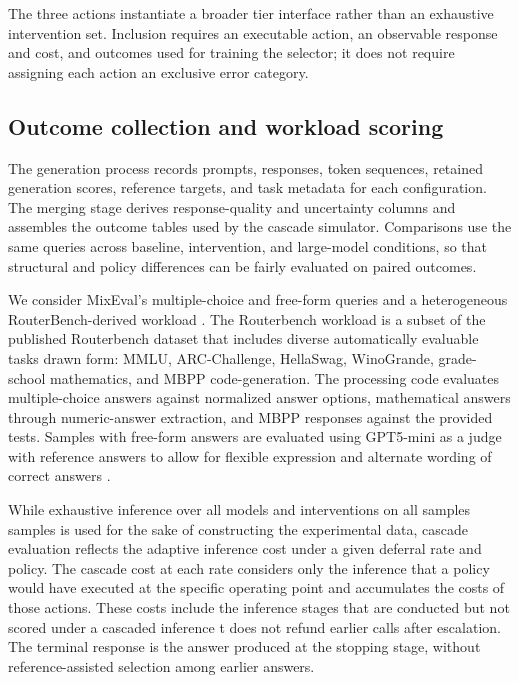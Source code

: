 \documentclass[sigconf]{acmart}
\begin{document}
The three actions instantiate a broader tier interface rather than an exhaustive intervention set. Inclusion requires an executable action, an observable response and cost, and outcomes used for training the selector; it does not require assigning each action an exclusive error category.

\subsection{Outcome collection and workload scoring}

The generation process records prompts, responses, token sequences, retained generation scores, reference targets, and task metadata for each configuration. The merging stage derives response-quality and uncertainty columns and assembles the outcome tables used by the cascade simulator. Comparisons use the same queries across baseline, intervention, and large-model conditions, so that structural and policy differences can be fairly evaluated on paired outcomes. 

We consider MixEval's multiple-choice and free-form queries \cite{mixeval} and a heterogeneous RouterBench-derived workload \cite{routerbench}. The Routerbench workload is a subset of the published Routerbench dataset that includes diverse automatically evaluable tasks drawn form: MMLU, ARC-Challenge, HellaSwag, WinoGrande, grade-school mathematics, and MBPP code-generation\cite{todo}. The processing code evaluates multiple-choice answers against normalized answer options, mathematical answers through numeric-answer extraction, and MBPP responses against the provided tests. Samples with free-form answers are evaluated using GPT5-mini as a judge with reference answers to allow for flexible expression and alternate wording of correct answers \cite{todo gpt judge}. 

While exhaustive inference over all models and interventions on all samples samples is used for the sake of constructing the experimental data, cascade evaluation reflects the adaptive inference cost under a given deferral rate and policy. The cascade cost at each rate considers only the inference that a policy would have executed at the specific operating point and accumulates the costs of those actions. These costs include the inference stages that are conducted but not scored under a cascaded inference t does not refund earlier calls after escalation. The terminal response is the answer produced at the stopping stage, without reference-assisted selection among earlier answers.
\end{document}
